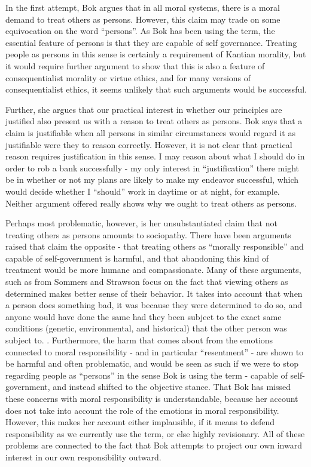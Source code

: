 \documentclass[phd,12pt,oneside,paper=letterpaper]{ubcthesis}
\begin{document}
In the first attempt, Bok argues that in all moral systems, there is a moral demand to treat others as persons. However, this claim may trade on some equivocation on the word ``persons''. As Bok has been using the term, the essential feature of persons is that they are capable of self governance. Treating people as persons in this sense is certainly a requirement of Kantian morality, but it would require further argument to show that this is also a feature of consequentialist morality or virtue ethics, and for many versions of consequentialist ethics, it seems unlikely that such arguments would be successful.

Further, she argues that our practical interest in whether our principles are justified also present us with a reason to treat others as persons. Bok says that a claim is justifiable when all persons in similar circumstances would regard it as justifiable were they to reason correctly. However, it is not clear that practical reason requires justification in this sense. I may reason about what I should do in order to rob a bank successfully - my only interest in ``justification'' there might be in whether or not my plans are likely to make my endeavor successful, which would decide whether I ``should'' work in daytime or at night, for example. Neither argument offered really shows why we ought to treat others as persons.

Perhaps most problematic, however, is her unsubstantiated claim that not treating others as persons amounts to sociopathy. There have been arguments raised that claim the opposite - that treating others as ``morally responsible'' and capable of self-government is harmful, and that abandoning this kind of treatment would be more humane and compassionate. Many of these arguments, such as from Sommers \citeyearpar{sommers2007} and Strawson \citeyearpar{strawsong2010} focus on the fact that viewing others as determined makes better sense of their behavior. It takes into account that when a person does something bad, it was because they were determined to do so, and anyone would have done the same had they been subject to the exact same conditions (genetic, environmental, and historical) that the other person was subject to. \citep{sommers2007}. Furthermore, the harm that comes about from the emotions connected to moral responsibility - and in particular ``resentment'' - are shown to be harmful and often problematic, and would be seen as such if we were to stop regarding people as ``persons'' in the sense Bok is using the term - capable of self-government, and instead shifted to the objective stance. That Bok has missed these concerns with moral responsibility is understandable, because her account does not take into account the role of the emotions in moral responsibility. However, this makes her account either implausible, if it means to defend responsibility as we currently use the term, or else highly revisionary. All of these problems are connected to the fact that Bok attempts to project our own inward interest in our own responsibility outward. 
\end{document}
